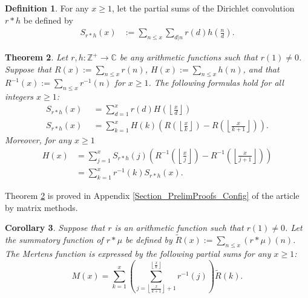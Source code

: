 \documentclass[11pt,reqno,a4letter]{article}
\newcommand{\hlocalref}[1]{\hyperref[#1]{\ref{#1}}}
\numberwithin{equation}{section}
\numberwithin{figure}{section}
\numberwithin{table}{section}
\newcommand{\floor}[1]{\left\lfloor #1 \right\rfloor}
\newcommand{\Floor}[2]{\ensuremath{\left\lfloor \frac{#1}{#2} \right\rfloor}}
\theoremstyle{plain}
\newtheorem{theorem}{Theorem}
\newtheorem{cor}[theorem]{Corollary}
\numberwithin{theorem}{section}
\theoremstyle{definition}
\newtheorem{definition}[theorem]{Definition}
\begin{document}
\begin{definition}
For any $x \geq 1$, let the partial sums of the Dirichlet convolution $r \ast h$ be defined by 
\begin{align*} 
S_{r \ast h}(x) & := \sum_{n \leq x} \sum_{d|n} r(d) h\left(\frac{n}{d}\right). 
\end{align*}
\end{definition}

\begin{theorem} 
\label{theorem_SummatoryFuncsOfDirCvls} 
Let $r,h: \mathbb{Z}^{+} \rightarrow \mathbb{C}$ be any 
arithmetic functions such that $r(1) \neq 0$. 
Suppose that $R(x) := \sum_{n \leq x} r(n)$, $H(x) := \sum_{n \leq x} h(n)$, and that 
$R^{-1}(x) := \sum_{n \leq x} r^{-1}(n)$ for $x \geq 1$. 
The following formulas hold for all integers $x \geq 1$: 
\begin{align*} 
S_{r \ast h}(x) & \phantom{:}= \sum_{d=1}^x r(d) H\left(\Floor{x}{d}\right) \\ 
S_{r \ast h}(x) & \phantom{:}= \sum_{k=1}^{x} H(k) \left(R\left(\Floor{x}{k}\right) - 
     R\left(\Floor{x}{k+1}\right)\right). 
\end{align*} 
Moreover, for any $x \geq 1$ 
\begin{align*} 
H(x) & = \sum_{j=1}^{x} S_{r \ast h}(j) \left(R^{-1}\left(\Floor{x}{j}\right) - 
     R^{-1}\left(\Floor{x}{j+1}\right)\right) \\ 
     & = \sum_{k=1}^{x} r^{-1}(k) S_{r \ast h}(x). 
\end{align*} 
\end{theorem} 

Theorem \hlocalref{theorem_SummatoryFuncsOfDirCvls} 
is proved in Appendix \hlocalref{Section_PrelimProofs_Config} 
of the article by matrix methods. 

\begin{cor} 
\label{cor_CvlGAstMu} 
Suppose that $r$ is an arithmetic function such that 
$r(1) \neq 0$. Let the summatory function of $r \ast \mu$ be defined by 
$\widetilde{R}(x) := \sum_{n \leq x} (r \ast \mu)(n)$. 
The Mertens function is expressed by the following 
partial sums for any $x \geq 1$: 
\[
M(x) = \sum_{k=1}^{x} \left(\sum_{j=\floor{\frac{x}{k+1}}+1}^{\floor{\frac{x}{k}}} r^{-1}(j)\right) 
     \widetilde{R}(k). 
\]
\end{cor} 
\end{document}
